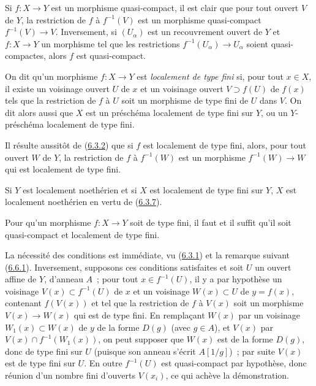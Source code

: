 Si $f:X\to Y$ est un morphisme quasi-compact, il est clair que pour tout
ouvert $V$ de $Y$, la restriction de $f$ à $f^{-1}(V)$ est un morphisme
quasi-compact $f^{-1}(V)\to V$. Inversement, si $(U_\alpha)$ est un
recouvrement ouvert de $Y$ et $f:X\to Y$ un morphisme tel que les restrictions
$f^{-1}(U_\alpha)\to U_\alpha$ soient quasi-compactes, alors $f$ est
quasi-compact.

\begin{definition}[6.6.2]
\label{I.6.6.2-fr}
On dit qu'un morphisme $f:X\to Y$ est \emph{localement de type fini} si, pour
tout $x\in X$, il existe un voisinage ouvert $U$ de $x$ et un voisinage ouvert
$V\supset f(U)$ de $f(x)$ tels que la
restriction de $f$ à $U$ soit un morphisme de type fini de $U$ dans $V$. On
dit alors aussi que $X$ est un préschéma localement de type fini sur $Y$, ou
un $Y$-préschéma localement de type fini.
\end{definition}

Il résulte aussitôt de (\hyperref[I.6.3.2-fr]{6.3.2}) que si $f$ est
localement de type fini, alors, pour tout ouvert $W$ de $Y$, la restriction
de $f$ à $f^{-1}(W)$ est un morphisme $f^{-1}(W)\to W$ qui est localement de
type fini.

Si $Y$ est localement noethérien et si $X$ est localement de type fini sur
$Y$, $X$ est localement noethérien en vertu de
(\hyperref[I.6.3.7-fr]{6.3.7}).

\begin{proposition}[6.6.3]
\label{I.6.6.3-fr}
Pour qu'un morphisme $f:X\to Y$ soit de type fini, il faut et il suffit qu'il
soit quasi-compact et localement de type fini.
\end{proposition}

La nécessité des conditions est immédiate, vu
(\hyperref[I.6.3.1-fr]{6.3.1}) et la remarque suivant
(\hyperref[I.6.6.1-fr]{6.6.1}). Inversement, supposons ces conditions
satisfaites et soit $U$ un ouvert affine de $Y$, d'anneau $A$~; pour tout
$x\in f^{-1}(U)$, il y a par hypothèse un voisinage
$V(x)\subset f^{-1}(U)$ de $x$ et un voisinage $W(x)\subset U$ de
$y=f(x)$, contenant $f(V(x))$ et tel que la restriction de $f$ à $V(x)$ soit
un morphisme $V(x)\to W(x)$ qui est de type fini. En remplaçant $W(x)$ par
un voisinage $W_1(x)\subset W(x)$ de $y$ de la forme $D(g)$ (avec $g\in A$),
et $V(x)$ par $V(x)\cap f^{-1}(W_1(x))$, on peut supposer que $W(x)$ est de
la forme $D(g)$, donc de type fini sur $U$ (puisque son anneau s'écrit
$A[1/g]$)~; par suite $V(x)$ est de type fini sur $U$. En outre
$f^{-1}(U)$ est quasi-compact par hypothèse, donc réunion d'un nombre fini
d'ouverts $V(x_i)$, ce qui achève la démonstration.


